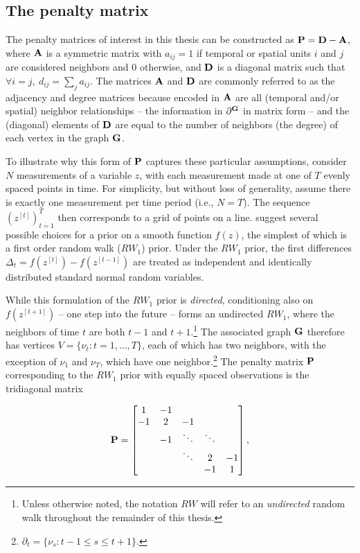 \subsection{The penalty matrix} 
\label{penalty_matrix}

The penalty matrices of interest in this thesis 
can be constructed as $\mathbf{P} = \mathbf{D} - \mathbf{A}$, where $\mathbf{A}$ is a symmetric 
matrix with $a_{ij} = 1$ if temporal or spatial units $i$ and $j$ are considered neighbors and 
0 otherwise, and $\mathbf{D}$ is a diagonal matrix such that 
$\forall i = j, \: d_{ij} = \sum_j a_{ij}$. The matrices $\mathbf{A}$ and $\mathbf{D}$ are 
commonly referred to as the adjacency and degree matrices because encoded in 
$\mathbf{A}$ are all (temporal and/or spatial) neighbor relationships -- the information 
in $\partial^{\mathbf{G}}$ in matrix form -- and the (diagonal) elements of $\mathbf{D}$ 
are equal to the number of neighbors (the degree) of each vertex in the 
graph $\mathbf{G}$. 

To illustrate why this form of $\mathbf{P}$ captures these particular assumptions, 
consider $N$ measurements of a variable $z$, with each measurement made at 
one of $T$ evenly spaced points in time. For simplicity, but without loss of generality,  
assume there is exactly one measurement per time period (i.e., $N = T$).  
The sequence $(z^{[t]})_{t=1}^T$ then corresponds to a grid of points on a line. 
 suggest several possible choices for a prior on a smooth
function $f(z)$, the simplest of which is a first order random walk ($RW_1$) prior.  Under 
the $RW_1$ prior, the first differences $\Delta_t = f(z^{[t]}) - f(z^{[t-1]})$ are treated as 
independent and identically distributed standard normal random variables. 

While this formulation of the $RW_1$ prior is {\it directed}, conditioning also on 
$f(z^{[t+1]})$ -- one step into the future -- forms an undirected $RW_1$, where 
the neighbors of time $t$ are both $t-1$ and $t+1$.\footnote{Unless otherwise 
noted, the notation $RW$ will refer to an {\it undirected} random walk throughout 
the remainder of this thesis.} The associated graph $\mathbf{G}$ therefore has vertices 
$V=\{\nu_t : t=1,\dots,T\}$, each of which has two neighbors, with the exception of 
$\nu_1$ and $\nu_T$, which have one neighbor.\footnote{$\partial_t = \{\nu_{s} : 
t - 1 \leq s \leq t + 1\}.$}  The penalty matrix $\mathbf{P}$ corresponding to the $RW_1$ 
prior with equally spaced observations is the tridiagonal matrix

\begin{equation*}
\mathbf{P} = 
\begin{bmatrix}
1  	& -1 	& 		& 	& \\
-1  	& 2 	& -1 		& 	& \\
  	& -1 & \ddots 	& \ddots	& \\
  	&  	& \ddots 	& 2 	& -1\\
  	&  	& 		& -1 	& 1\\
\end{bmatrix},
\end{equation*}

